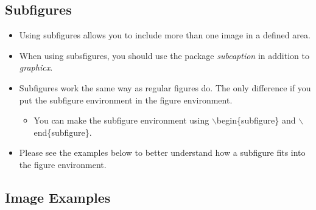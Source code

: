\documentclass{article}
\begin{document}
		\subsection{Subfigures}
			\begin{itemize}
				\item Using subfigures allows you to include more than one image in a defined area.
				\item When using subsfigures, you should use the package \textit{subcaption} in addition to \textit{graphicx}.
				\item Subfigures work the same way as regular figures do. The only difference if you put the subfigure environment in the figure environment.
				\begin{itemize}
					\item You can make the subfigure environment using $\backslash$begin\{subfigure\} and $\backslash$end\{subfigure\}.
				\end{itemize}
				\item Please see the examples below to better understand how a subfigure fits into the figure environment.
			\end{itemize}

		\newpage
		\subsection{Image Examples}
\end{document}
